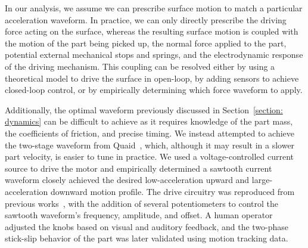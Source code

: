 
In our analysis, we assume we can prescribe surface motion to match a particular acceleration waveform.
%
In practice, we can only directly prescribe the driving force acting on the surface, whereas the resulting surface motion is coupled with the motion of the part being picked up, the normal force applied to the part, potential external mechanical stops and springs, and the electrodynamic response of the driving mechanism.
%
This coupling can be resolved either by using a theoretical model to drive the surface in open-loop, by adding sensors to achieve closed-loop control, or by empirically determining which force waveform to apply.

Additionally, the optimal waveform previously discussed in Section~\ref{section: dynamics} can be difficult to achieve as it requires knowledge of the part mass, the coefficients of friction, and precise timing. 
%
We instead attempted to achieve the two-stage waveform from Quaid~\cite{quaid1999feeder}, which, although it may result in a slower part velocity, is easier to tune in practice.
%
We used a voltage-controlled current source to drive the motor and empirically determined a sawtooth current waveform closely achieved the desired low-acceleration upward and large-acceleration downward motion profile.
%
The drive circuitry was reproduced from previous works~\cite{choi2017grabity, mcmahan2014dynamic}, with the addition of several potentiometers to control the sawtooth waveform's frequency, amplitude, and offset.
%
A human operator adjusted the knobs based on visual and auditory feedback, and the two-phase stick-slip behavior of the part was later validated using motion tracking data.
